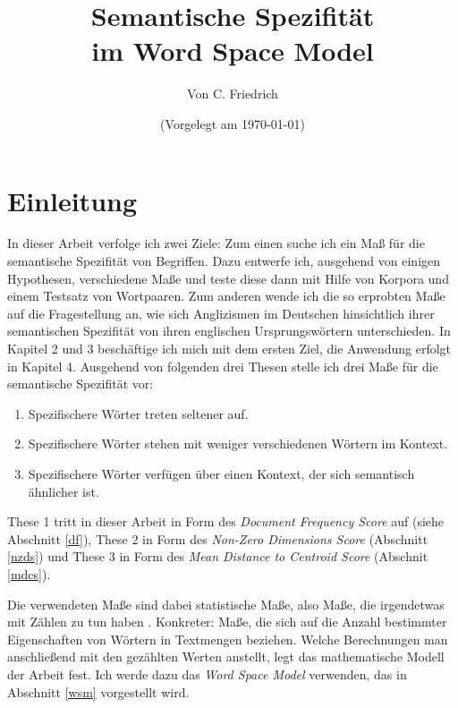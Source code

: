 \documentclass[11pt,numbers=noenddot]{scrartcl}
\title{Semantische Spezifität \\im Word Space Model}
\author{Von C. Friedrich}
\date{(Vorgelegt am \today)}
\begin{document}
\begin{titlepage}
\maketitle


\thispagestyle{empty}
\end{titlepage}

\tableofcontents
\newpage

\section{Einleitung}

In dieser Arbeit verfolge ich zwei Ziele: Zum einen suche ich ein Maß für die semantische Spezifität von Begriffen. Dazu entwerfe ich, ausgehend von einigen Hypothesen, verschiedene Maße und teste diese dann mit Hilfe von Korpora und einem Testsatz von Wortpaaren. Zum anderen wende ich die so erprobten Maße auf die Fragestellung an, wie sich Anglizismen im Deutschen hinsichtlich ihrer semantischen Spezifität von ihren englischen Ursprungswörtern unterschieden. In Kapitel 2 und 3 beschäftige ich mich mit dem ersten Ziel, die Anwendung erfolgt in Kapitel 4. Ausgehend von folgenden drei Thesen stelle ich drei Maße für die semantische Spezifität vor:
\begin{enumerate}
    \item Spezifischere Wörter treten seltener auf.
    \item Spezifischere Wörter stehen mit weniger verschiedenen Wörtern im Kontext.
    \item Spezifischere Wörter verfügen über einen Kontext, der sich semantisch ähnlicher ist.
\end{enumerate}

These 1 tritt in dieser Arbeit in Form des \emph{Document Frequency Score} auf (siehe Abschnitt \ref{df}), These 2 in Form des \emph{Non-Zero Dimensions Score} (Abschnitt \ref{nzds}) und These 3 in Form des \emph{Mean Distance to Centroid Score} (Abschnit \ref{mdcs}).

Die verwendeten Maße sind dabei statistische Maße, also Maße, die irgendetwas mit Zählen zu tun haben \citep[]{manning1999}. Konkreter: Maße, die sich auf die Anzahl bestimmter Eigenschaften von Wörtern in Textmengen beziehen. Welche Berechnungen man anschließend mit den gezählten Werten anstellt, legt das mathematische Modell der Arbeit fest. Ich werde dazu das \emph{Word Space Model} verwenden, das in Abschnitt \ref{wsm} vorgestellt wird.
\end{document}
